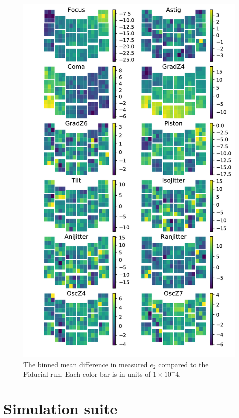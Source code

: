 \documentclass[aps,prd, amsmath,amssymb,superscriptaddress,showkeys,nofootinbib,reprint,preprintnumbers]{revtex4-1}
\begin{document}
\begin{figure}
\begin{center}
\includegraphics[width=\columnwidth]{figures/focal_mean_e2.pdf}
\end{center}
\caption[]{
The binned mean difference in measured $e_2$ compared to the Fiducial run.  Each color bar is in units of $1\times 10^-4$.
\label{fig:focal_mean_e2}}
\end{figure}


\section{Simulation suite}\label{sec:sim}
\end{document}
